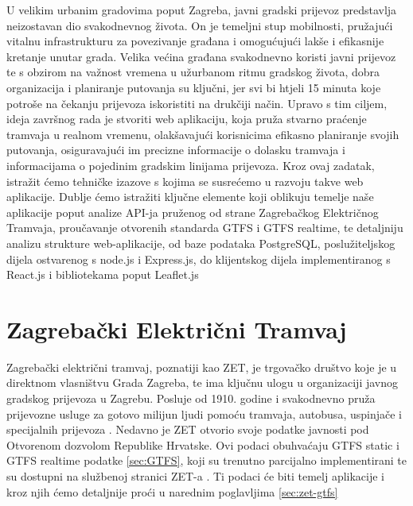 \documentclass[zavrsnirad]{fer}
\begin{document}
U velikim urbanim gradovima poput Zagreba, javni gradski prijevoz predstavlja neizostavan dio svakodnevnog života. On je temeljni stup mobilnosti, pružajući vitalnu infrastrukturu za povezivanje građana i omogućujući lakše i efikasnije kretanje unutar grada. Velika većina građana svakodnevno koristi javni prijevoz te s obzirom na važnost vremena u užurbanom ritmu gradskog života, dobra organizacija i planiranje putovanja su ključni, jer svi bi htjeli 15 minuta koje potroše na čekanju prijevoza iskoristiti na drukčiji način. Upravo s tim ciljem, ideja završnog rada je stvoriti web aplikaciju, koja pruža stvarno praćenje tramvaja u realnom vremenu, olakšavajući korisnicima efikasno planiranje svojih putovanja, osiguravajući im precizne informacije o dolasku tramvaja i informacijama o pojedinim gradskim linijama prijevoza. Kroz ovaj zadatak, istražit ćemo tehničke izazove s kojima se susrećemo u razvoju takve web aplikacije. Dublje ćemo istražiti ključne elemente koji oblikuju temelje naše aplikacije poput analize API-ja pruženog od strane Zagrebačkog Električnog Tramvaja, proučavanje otvorenih standarda GTFS i GTFS realtime, te detaljniju analizu strukture web-aplikacije, od baze podataka PostgreSQL, poslužiteljskog dijela ostvarenog s node.js i Express.js, do klijentskog dijela implementiranog s React.js i bibliotekama poput Leaflet.js







\chapter{Zagrebački Električni Tramvaj}
Zagrebački električni tramvaj, poznatiji kao ZET, je trgovačko društvo koje je u direktnom
vlasništvu Grada Zagreba, te ima ključnu ulogu u organizaciji javnog gradskog prijevoza u Zagrebu.
Posluje od 1910. godine i svakodnevno pruža prijevozne usluge za gotovo milijun ljudi pomoću
tramvaja, autobusa, uspinjače i specijalnih prijevoza \cite{ZET}.
Nedavno je ZET otvorio svoje podatke javnosti pod Otvorenom dozvolom Republike Hrvatske. Ovi podaci obuhvaćaju GTFS static i GTFS realtime podatke \ref{sec:GTFS}, koji su trenutno parcijalno implementirani te su dostupni na službenoj stranici ZET-a \cite{ZET-GTFS}.
Ti podaci će biti temelj aplikacije i kroz njih ćemo detaljnije proći u narednim poglavljima \ref{sec:zet-gtfs}
\\\\
\end{document}
